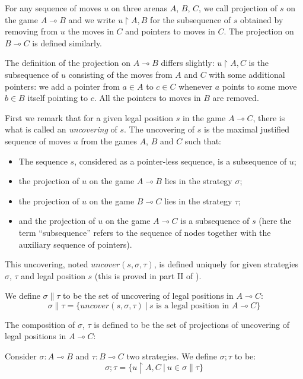 For any sequence of moves $u$ on three arenas $A$, $B$, $C$, we call
projection of $s$ on the game $A \multimap B$ and we write $u
\upharpoonright A,B$ for the subsequence of $s$ obtained by removing
from $u$ the moves in $C$ and pointers to moves in $C$. The
projection on $B \multimap C$ is defined similarly.

The definition of the projection on $A \multimap B$ differs
slightly: $u \upharpoonright A,C$ is the subsequence of $u$
consisting of the moves from $A$ and $C$ with some additional
pointers: we add a pointer from $a \in A$ to $c\in C$ whenever $a$
points to some move $b \in B$ itself pointing to $c$. All the
pointers to moves in $B$ are removed.


First we remark that for a given legal position $s$ in the game $A
\multimap C$, there is what is called an \emph{uncovering} of $s$.
The uncovering of $s$ is the maximal justified sequence of moves $u$
from the games $A$, $B$ and $C$ such that:
\begin{itemize}
\item The sequence $s$, considered as a pointer-less sequence, is a subsequence of
$u$;
\item the projection of $u$ on the game $A \multimap B$ lies in the
strategy $\sigma$;
\item the projection of $u$ on the game $B \multimap C$
lies in the strategy $\tau$;
\item and the projection of $u$ on the game $A \multimap C$ is a subsequence of $s$ (here the term ``subsequence'' refers to the sequence of nodes together with the auxiliary sequence of pointers).
\end{itemize}
This uncovering, noted $uncover(s, \sigma, \tau)$, is
defined uniquely for given strategies $\sigma$, $\tau$ and legal
position $s$ (this is proved in part II of \cite{hylandong_pcf}).

We define $\sigma \| \tau $ to be the set of uncovering of legal
positions in $A \multimap C$:
$$ \sigma \| \tau = \{ uncover(s, \sigma, \tau) \ | \ s \mbox{ is a legal position in } A \multimap C \}$$

The composition of $\sigma$, $\tau$ is defined to be the set of
projections of uncovering of legal positions in $A \multimap C$:

\begin{dfn}
Consider $\sigma : A \multimap B$ and  $\tau : B \multimap C$ two
strategies. We define $\sigma ; \tau$ to be:
$$ \sigma ; \tau = \{ u \upharpoonright A,C \ | \ u \in \sigma \|
\tau \}$$
\end{dfn}

